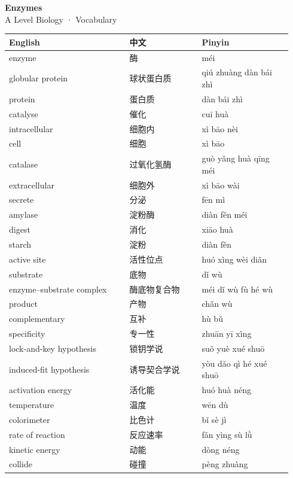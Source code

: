 \documentclass[11pt]{article}
\begin{document}
\begin{center}
  {\LARGE\bfseries Enzymes}\\[0.35em]
  {\large A Level Biology · Vocabulary}
\end{center}
\vspace{0.6em}

\begin{longtable}{@{}p{0.40\linewidth}p{0.24\linewidth}p{0.30\linewidth}@{}}
\toprule
\textbf{English} & \textbf{中文} & \textbf{Pinyin} \\
\midrule
\endhead
\bottomrule
\endlastfoot
enzyme & 酶 & méi \\
globular protein & 球状蛋白质 & qiú zhuàng dàn bái zhì \\
protein & 蛋白质 & dàn bái zhì \\
catalyse & 催化 & cuī huà \\
intracellular & 细胞内 & xì bāo nèi \\
cell & 细胞 & xì bāo \\
catalase & 过氧化氢酶 & guò yǎng huà qīng méi \\
extracellular & 细胞外 & xì bāo wài \\
secrete & 分泌 & fēn mì \\
amylase & 淀粉酶 & diàn fěn méi \\
digest & 消化 & xiāo huà \\
starch & 淀粉 & diàn fěn \\
active site & 活性位点 & huó xìng wèi diǎn \\
substrate & 底物 & dǐ wù \\
enzyme–substrate complex & 酶底物复合物 & méi dǐ wù fù hé wù \\
product & 产物 & chǎn wù \\
complementary & 互补 & hù bǔ \\
specificity & 专一性 & zhuān yī xìng \\
lock-and-key hypothesis & 锁钥学说 & suǒ yuè xué shuō \\
induced-fit hypothesis & 诱导契合学说 & yòu dǎo qì hé xué shuō \\
activation energy & 活化能 & huó huà néng \\
temperature & 温度 & wēn dù \\
colorimeter & 比色计 & bǐ sè jì \\
rate of reaction & 反应速率 & fǎn yìng sù lǜ \\
kinetic energy & 动能 & dòng néng \\
collide & 碰撞 & pèng zhuàng \\

\end{longtable}
\end{document}
